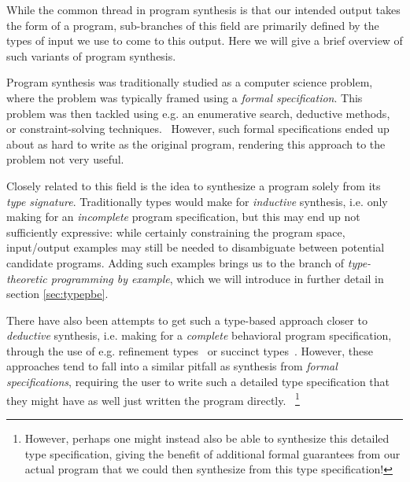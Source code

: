 \documentclass{article}
\begin{document}
While the common thread in program synthesis is that our intended output takes the form of a program,
sub-branches of this field are primarily defined by the types of input we use to come to this output.
Here we will give a brief overview of such variants of program synthesis.


Program synthesis was traditionally studied as a computer science problem,
where the problem was typically framed using a \emph{formal specification}.
This problem was then tackled using e.g. an enumerative search, deductive methods, or constraint-solving techniques.~\citep{gulwani2017program}
However, such formal specifications ended up about as hard to write as the original program,
rendering this approach to the problem not very useful.

Closely related to this field is the idea to synthesize a program solely from its \emph{type signature}.
Traditionally types would make for \emph{inductive} synthesis,
i.e. only making for an \emph{incomplete} program specification,
but this may end up not sufficiently expressive:
while certainly constraining the program space,
input/output examples may still be needed to disambiguate between potential candidate programs.
Adding such examples brings us to the branch of \emph{type-theoretic programming by example},
which we will introduce in further detail in section \ref{sec:typepbe}.

There have also been attempts to get such a type-based approach closer to \emph{deductive} synthesis,
i.e. making for a \emph{complete} behavioral program specification,
through the use of e.g. refinement types~\citep{synquid} or succinct types~\citep{guospeeding}.
However, these approaches tend to fall into a similar pitfall as synthesis from \emph{formal specifications},
requiring the user to write such a detailed type specification that they might have as well just written the program directly.%
~\footnote{
    However, perhaps one might instead also be able to synthesize this detailed type specification,
    giving the benefit of additional formal guarantees from our actual program that we could then synthesize from this type specification!
}
\end{document}
